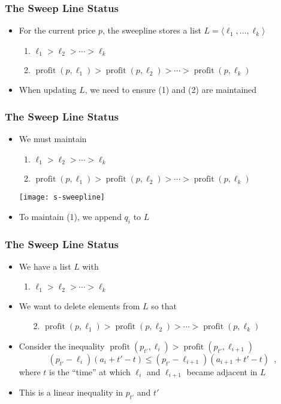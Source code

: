 \documentclass{beamer}
\DeclareMathOperator{\val}{profit}
\begin{document}
\frame
{
  \frametitle{The Sweep Line Status}
  \begin{itemize}
    \item For the current price $p$, the sweepline stores a list $L=\langle
\ell_1,\ldots,\ell_k\rangle$
    \begin{enumerate}
      \item $\ell_1>\ell_2>\cdots>\ell_k$
      \item $\val(p,\ell_1)>\val(p,\ell_2)>\cdots>\val(p,\ell_k)$
    \end{enumerate}
    \item When updating $L$, we need to ensure (1) and (2) are maintained
  \end{itemize}
}

\frame
{
  \frametitle{The Sweep Line Status}
  \begin{itemize}
    \item We must maintain
    \begin{enumerate}
      \item $\ell_1>\ell_2>\cdots>\ell_k$
      \item $\val(p,\ell_1)>\val(p,\ell_2)>\cdots>\val(p,\ell_k)$
    \end{enumerate}
    \texttt{[image: s-sweepline]}
    \item To maintain (1), we append $q_i$ to $L$
  \end{itemize}
}

\frame
{
  \frametitle{The Sweep Line Status}
  \begin{itemize}
    \item We have a list $L$ with
    \begin{enumerate}
      \item $\ell_1>\ell_2>\cdots>\ell_k$
    \end{enumerate}
    \item We want to delete elements from $L$ so that
    \begin{enumerate} 
      \item[2.] $\val(p,\ell_1)>\val(p,\ell_2)>\cdots>\val(p,\ell_k)$
    \end{enumerate}
    \item Consider the inequality $\val(p_{t'},\ell_i) > \val(p_{t'},\ell_{i+1})$
      \[
         (p_{t'}-\ell_i)(a_i+t'-t) \le (p_{t'}-\ell_{i+1})(a_{i+1}+t'-t)  \enspace , 
      \]
      where $t$ is the ``time'' at which $\ell_i$ and $\ell_{i+1}$ became
adjacent in $L$
    \item This is a linear inequality in $p_{t'}$ and $t'$
  \end{itemize}
}
\end{document}
